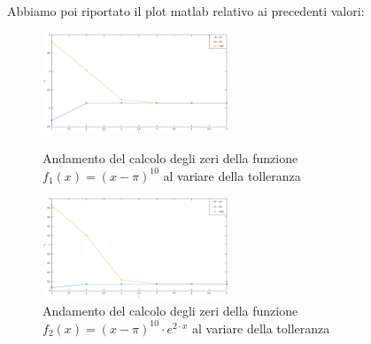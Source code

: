 \begin{flushleft}
\begin{center}
\begin{tabular}{|c|c|c|c|}
\hline
\end{tabular}
\end{center}
Abbiamo poi riportato il plot matlab relativo ai precedenti valori:
\begin{figure}[H]
\includegraphics[left, width=210px]{plot/fes24a.eps}
\caption{Andamento del calcolo degli zeri della funzione $f_1(x)=(x-\pi)^{10}$ al variare della tolleranza}
\includegraphics[left, width=210px]{plot/fes24b.eps}
\caption{Andamento del calcolo degli zeri della funzione $f_2(x) = (x-\pi)^{10} \cdot e^{2\cdot x}$ al variare della tolleranza}
\end{figure}
\end{flushleft}